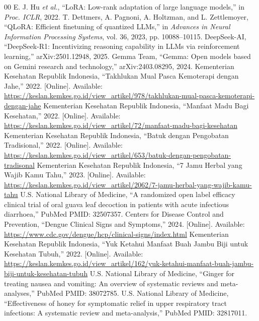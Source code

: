 \documentclass[conference]{IEEEtran}
\begin{document}
\begin{thebibliography}{00}
 E. J. Hu \emph{et al.}, ``LoRA: Low-rank adaptation of large language models,'' in \emph{Proc. ICLR}, 2022.
 T. Dettmers, A. Pagnoni, A. Holtzman, and L. Zettlemoyer, ``QLoRA: Efficient finetuning of quantized LLMs,'' in \emph{Advances in Neural Information Processing Systems}, vol. 36, 2023, pp. 10088--10115.
 DeepSeek-AI, ``DeepSeek-R1: Incentivizing reasoning capability in LLMs via reinforcement learning,'' arXiv:2501.12948, 2025.
 Gemma Team, ``Gemma: Open models based on Gemini research and technology,'' arXiv:2403.08295, 2024.
 Kementerian Kesehatan Republik Indonesia, ``Takhlukan Mual Pasca Kemoterapi dengan Jahe,'' 2022. [Online]. Available: \url{https://keslan.kemkes.go.id/view_artikel/978/takhlukan-mual-pasca-kemoterapi-dengan-jahe}
 Kementerian Kesehatan Republik Indonesia, ``Manfaat Madu Bagi Kesehatan,'' 2022. [Online]. Available: \url{https://keslan.kemkes.go.id/view_artikel/72/manfaat-madu-bagi-kesehatan}
 Kementerian Kesehatan Republik Indonesia, ``Batuk dengan Pengobatan Tradisional,'' 2022. [Online]. Available: \url{https://keslan.kemkes.go.id/view_artikel/653/batuk-dengan-pengobatan-tradisonal}
 Kementerian Kesehatan Republik Indonesia, ``7 Jamu Herbal yang Wajib Kamu Tahu,'' 2023. [Online]. Available: \url{https://keslan.kemkes.go.id/view_artikel/2062/7-jamu-herbal-yang-wajib-kamu-tahu}
 U.S. National Library of Medicine, ``A randomized open label efficacy clinical trial of oral guava leaf decoction in patients with acute infectious diarrhoea,'' PubMed PMID: 32507357.
 Centers for Disease Control and Prevention, ``Dengue Clinical Signs and Symptoms,'' 2024. [Online]. Available: \url{https://www.cdc.gov/dengue/hcp/clinical-signs/index.html}
 Kementerian Kesehatan Republik Indonesia, ``Yuk Ketahui Manfaat Buah Jambu Biji untuk Kesehatan Tubuh,'' 2022. [Online]. Available: \url{https://keslan.kemkes.go.id/view_artikel/162/yuk-ketahui-manfaat-buah-jambu-biji-untuk-kesehatan-tubuh}
 U.S. National Library of Medicine, ``Ginger for treating nausea and vomiting: An overview of systematic reviews and meta-analyses,'' PubMed PMID: 38072785.
 U.S. National Library of Medicine, ``Effectiveness of honey for symptomatic relief in upper respiratory tract infections: A systematic review and meta-analysis,'' PubMed PMID: 32817011.
\end{thebibliography}
\end{document}
